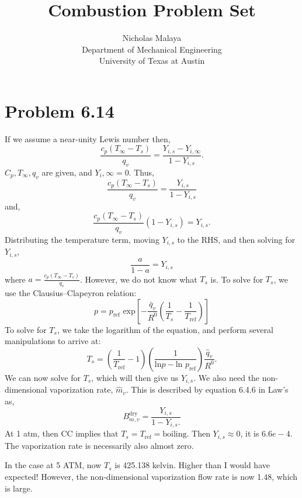 \documentclass{article}
\title{\bf{Combustion Problem Set}}
\author{Nicholas Malaya\\ Department of Mechanical Engineering \\
University of Texas at Austin}
\date{}
\begin{document}
\maketitle

\newpage
\section*{Problem 6.14}

If we assume a near-unity Lewis number then,
\begin{equation}
\frac{c_p (T_\infty - T_s)}{q_v} = \frac{Y_{i,s} - Y_{i,\infty}}{1-Y_{i,s}}.
\end{equation}
$C_p,T_\infty, q_v$ are given, and $Y_i,\infty=0$. Thus, 
\begin{equation}
\frac{c_p (T_\infty - T_s)}{q_v} = \frac{Y_{i,s}}{1-Y_{i,s}}
\end{equation}
and, 
\begin{equation}
\frac{c_p (T_\infty - T_s)}{q_v} (1-Y_{i,s}) = Y_{i,s}.
\end{equation}
Distributing the temperature term, moving $Y_{i,s}$ to the RHS, and then
solving for $Y_{i,s}$, 
\begin{equation}
\frac{a}{1-a} = Y_{i,s}
\end{equation}
where $a=\frac{c_p (T_\infty - T_s)}{q_v}$. However, we do not know what
$T_s$ is. To solve for $T_s$, we use the Clausius–Clapeyron relation:
\begin{equation}
 p = p_{\text{ref}}\text{ exp}\left[-\frac{\bar q_v}{R^0}\left(\frac{1}{T_s}-\frac{1}{T_{\text{ref}}}\right)\right]
\end{equation}
To solve for $T_s$, we take the logarithm of the equation, and perform
several manipulations to arrive at:
\begin{equation}
 T_s = \left(\frac{1}{T_{\text{ref}}} - 1 \right)
  \left(\frac{1}{\text{ln}p - \text{ln }p_{\text{ref}}}\right)
  \frac{\hat q_v}{R^0}. 
\end{equation}
We can now solve for $T_s$, which will then give us $Y_{i,s}$. We also
need the non-dimensional vaporization rate, $\hat m_v$. This is
described by equation 6.4.6 in Law's as, 
\begin{equation}
 B^{\text{dry}}_{m,v} = \frac{Y_{i,s}}{1-Y_{i,s}.}
\end{equation}
At 1 atm, then CC implies that $T_s = T_{\text{ref}} = \text{
boiling}$. Then $Y_{i,s} \approx 0$, it is $6.6e-4$. The vaporization
rate is necessarily also almost zero. 

In the case at 5 ATM, now $T_s$ is 425.138 kelvin. Higher than I would
have expected! However, the non-dimensional vaporization flow rate is
now 1.48, which is large. 
%
%
%
%
%
\newpage
\end{document}
